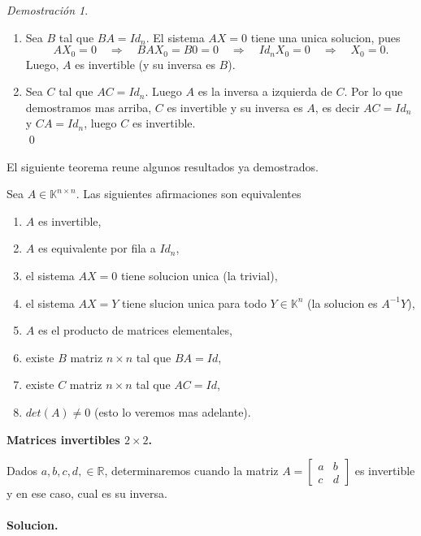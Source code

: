 \documentclass{article}
\theoremstyle{definition}
\theoremstyle{definition}
\theoremstyle{remark}
\newtheorem*{demo}{Demostración}
\begin{document}
\begin{demo}\;
  \begin{enumerate}[label=\textcolor{azulp2}{\arabic*.}]
    \item  Sea $B$ tal que $BA=Id_n$. El sistema $AX=0$ tiene una unica solucion, pues \[
AX_0=0 \quad \Rightarrow \quad BAX_0=B0=0 \quad \Rightarrow \quad Id_nX_0=0 \quad \Rightarrow \quad X_0 = 0.
      \]
      Luego, $A$ es invertible (y su inversa es $B$).
    \item Sea $C$ tal que $AC=Id_n$. Luego $A$ es la inversa a izquierda de $C$. Por lo que demostramos mas arriba, $C$ es invertible y su inversa es $A$, es decir $AC=Id_n$ y $CA=Id_n$, luego $C$ es invertible. \\
      \qed
 \end{enumerate}
\end{demo}
El siguiente teorema reune algunos resultados ya demostrados.
\begin{teo}
 Sea $A \in \mathbb{K}^{n \times n}$. Las siguientes afirmaciones son equivalentes \begin{enumerate}[label=\textcolor{azulp2}{\arabic*.}]
   \item $A$ es invertible, 
   \item $A$ es equivalente por fila a $Id_n$, 
   \item el sistema $AX=0$ tiene solucion unica (la trivial), 
   \item el sistema $AX=Y$ tiene slucion unica para todo $Y \in \mathbb{K}^{n}$ (la solucion es $A^{-1}Y$), 
   \item $A$ es el producto de matrices elementales,
   \item existe $B$ matriz $n \times n$ tal que $BA=Id$,
\item existe $C$ matriz $n \times n$ tal que $AC=Id$,
\item $det(A)\neq 0$ (esto lo veremos mas adelante).
 \end{enumerate}
\end{teo}
\begin{center}
\textbf{Matrices invertibles $2 \times 2$.}
\end{center}
Dados $a,b,c,d, \in \mathbb{R}$, determinaremos cuando la matriz $A=\begin{bmatrix}a & b \\ c & d \end{bmatrix}$ es invertible y en ese caso, cual es su inversa.
\\\\
\textbf{Solucion.}\\\\
\end{document}
